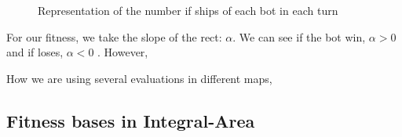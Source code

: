 \documentclass{llncs}
\begin{document}
\begin{figure}
\begin{center}
\end{center}
\caption{Representation of the number if ships of each bot in each turn} 
\label{figura:nubecita}
\end{figure}

For our fitness, we take the slope of the rect: {$\alpha$}. We can see if the bot win, {$\alpha>0$} and if loses, {$\alpha<0$} . However,  

How we are using several evaluations in different maps, 


\subsection{Fitness bases in Integral-Area}

\label{sec:fitness}
\end{document}
